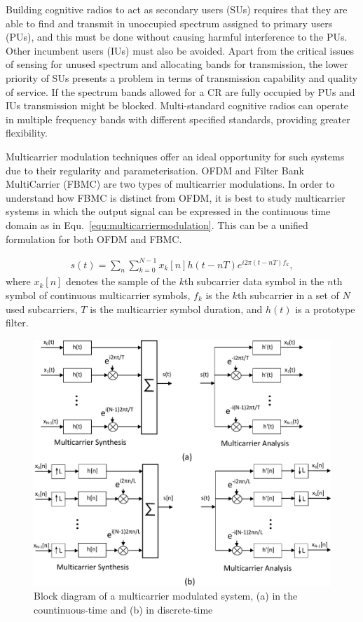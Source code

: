 Building cognitive radios to act as secondary users (SUs) requires that they are able to find and transmit in unoccupied spectrum assigned to primary users (PUs), and this must be done without causing harmful interference to the PUs.
Other incumbent users (IUs) must also be avoided.
Apart from the critical issues of sensing for unused spectrum and allocating bands for transmission, the lower priority of SUs presents a problem in terms of transmission capability and quality of service.
If the spectrum bands allowed for a CR are fully occupied by PUs and IUs transmission might be blocked.
Multi-standard cognitive radios can operate in multiple frequency bands with different specified standards, providing greater flexibility.

Multicarrier modulation techniques offer an ideal opportunity for such systems due to their regularity and parameterisation. OFDM and Filter Bank MultiCarrier (FBMC) are two types of multicarrier modulations.
In order to understand how FBMC is distinct from OFDM, it is best to study multicarrier systems in which the output signal can be expressed in the continuous time domain as in Equ.~\ref{equ:multicarriermodulation}.
This can be a unified formulation for both OFDM and FBMC.

\begin{eqnarray}
\label{equ:multicarriermodulation}
s(t) = \sum_{n}\sum_{k  = 0}^{N-1} x_{k}[n] h(t-nT)e^{i2\pi (t-nT)f_{k}},
\end{eqnarray}
where $x_{k}[n]$ denotes the sample of the $k$th subcarrier data symbol in the $n$th symbol of continuous multicarrier symbols, $f_{k}$ is the $k$th subcarrier in a set of $N$ used subcarriers, $T$ is the multicarrier symbol duration, and $h(t)$ is a prototype filter.

\begin{figure}
	\centerline{\includegraphics [width=0.8\columnwidth] {Figures/multucarrier_system} }
 	\caption{Block diagram of a multicarrier modulated system, (a) in the countinuous-time and (b) in discrete-time}
 	\label{fig:multicarrier-block}
\end{figure}

